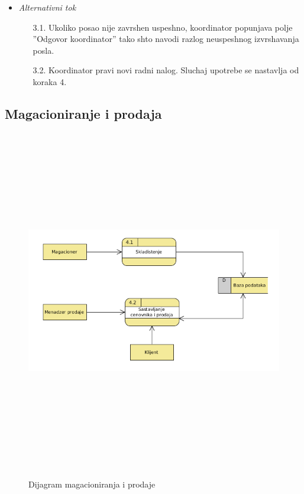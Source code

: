 \documentclass[10 pt]{article}
\begin{document}
\begin{itemize}
			\item\textit{Alternativni tok}
				\begin{enumerate}
					\item [3.1.] Ukoliko posao nije zavrshen uspeshno,
					koordinator popunjava polje ''Odgovor koordinator'' tako shto navodi razlog neuspeshnog izvrshavanja posla.
					\item [3.2.] Koordinator pravi novi radni nalog.
					Sluchaj upotrebe se nastavlja od koraka 4.		
				\end{enumerate}
			
		\end{itemize}
	
	
	\subsection{Magacioniranje i prodaja}
	
		\begin{figure}[H]
			\centering
			\includegraphics[width=15cm,height=15cm,keepaspectratio]{slike/DTPMagacioniranje.png}\\
			\caption{Dijagram magacioniranja i prodaje}
		\end{figure}
	
\end{document}
